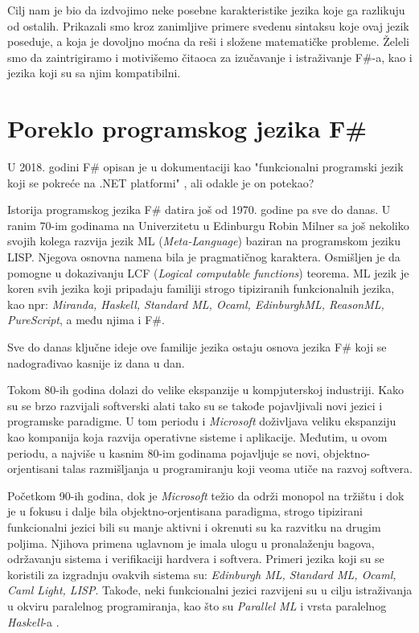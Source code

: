 \documentclass[a4paper]{article}
\begin{document}
Cilj nam je bio da izdvojimo neke posebne karakteristike jezika koje ga razlikuju od ostalih. Prikazali smo kroz zanimljive primere svedenu sintaksu koje ovaj jezik poseduje, a koja je dovoljno moćna da reši i složene matematičke probleme. Želeli smo da zaintrigiramo i motivišemo čitaoca za izučavanje i istraživanje F\#-a, kao i jezika koji su sa njim kompatibilni.

\section{Poreklo programskog jezika F\#}
\label{sec:poreklo}

U 2018. godini F\# opisan je u dokumentaciji kao "funkcionalni programski jezik koji se pokreće na .NET platformi" \cite{early_history}, ali odakle je on potekao?

Istorija programskog jezika F\# datira još od 1970. godine pa sve do danas. U ranim 70-im godinama na Univerzitetu u Edinburgu Robin Milner sa još nekoliko svojih kolega razvija jezik ML ({\em Meta-Language}) baziran na programskom jeziku LISP. Njegova osnovna namena bila je pragmatičnog karaktera. Osmišljen je da pomogne u dokazivanju LCF ({\em Logical computable functions}) \cite{Milner:1972:LCF:891954} teorema. ML jezik je koren svih jezika koji pripadaju familiji strogo tipiziranih funkcionalnih jezika, kao npr: {\em Miranda, Haskell, Standard ML, Ocaml, EdinburghML, ReasonML, PureScript}, a među njima i F\#.

Sve do danas ključne ideje ove familije jezika ostaju osnova jezika F\# koji se nadograđivao kasnije iz dana u dan. 

Tokom 80-ih godina dolazi do velike ekspanzije u kompjuterskoj industriji. Kako su se brzo razvijali softverski alati tako su se takođe pojavljivali novi jezici i programske paradigme. U tom periodu i {\em Microsoft} doživljava veliku ekspanziju kao kompanija koja razvija operativne sisteme i aplikacije. Međutim, u ovom periodu, a najviše u kasnim 80-im godinama pojavljuje se novi, objektno-orjentisani talas razmišljanja u programiranju koji veoma utiče na razvoj softvera.

Početkom 90-ih godina, dok je {\em Microsoft} težio da održi monopol na tržištu i dok je u fokusu i dalje bila objektno-orjentisana paradigma, strogo tipizirani funkcionalni jezici bili su manje aktivni i okrenuti su ka razvitku na drugim poljima. Njihova primena uglavnom je imala ulogu u pronalaženju bagova, održavanju sistema i verifikaciji hardvera i softvera. Primeri jezika koji su se koristili za izgradnju ovakvih sistema su: {\em Edinburgh ML, Standard ML, Ocaml, Caml Light, LISP}. Takođe, neki funkcionalni jezici razvijeni su u cilju istraživanja u okviru paralelnog programiranja, kao što su {\em Parallel ML} i vrsta paralelnog {\em Haskell}-a \cite{early_history}. 
\end{document}
